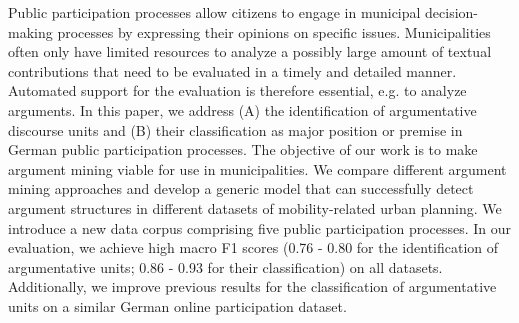 Public participation processes allow citizens to engage in municipal decision-making processes by expressing their opinions on specific issues. Municipalities often only have limited resources to analyze a possibly large amount of textual contributions that need to be evaluated in a timely and detailed manner. Automated support for the evaluation is therefore essential, e.g. to analyze arguments. In this paper, we address (A) the identification of argumentative discourse units and (B) their classification as major position or premise in German public participation processes. The objective of our work is to make argument mining viable for use in municipalities. We compare different argument mining approaches and develop a generic model that can successfully detect argument structures in different datasets of mobility-related urban planning. We introduce a new data corpus comprising five public participation processes. In our evaluation, we achieve high macro F1 scores (0.76 - 0.80 for the identification of argumentative units; 0.86 - 0.93 for their classification) on all datasets. Additionally, we improve previous results for the classification of argumentative units on a similar German online participation dataset.
